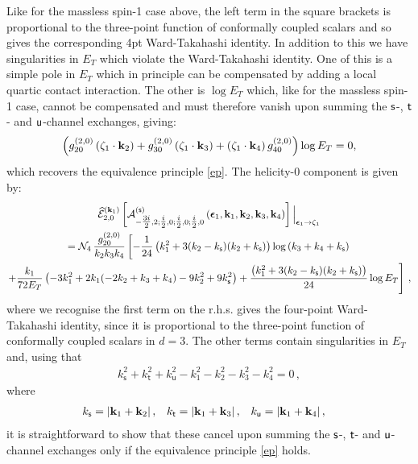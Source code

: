 \documentclass[11pt,a4paper]{article}
\begin{document}
 Like for the massless spin-1 case above, the left term in the square brackets is proportional to the three-point function of conformally coupled scalars and so gives the corresponding 4pt Ward-Takahashi identity. In addition to this we have singularities in $E_T$ which violate the Ward-Takahashi identity. One of this is a simple pole in $E_T$ which in principle can be compensated by adding a local quartic contact interaction. The other is $\log E_T$ which, like for the massless spin-1 case, cannot be compensated and must therefore vanish upon summing the ${\sf s}$-, ${\sf t}$- and ${\sf u}$-channel exchanges, giving:
\begin{equation}
    \left(g^{\left(2,0\right)}_{20}\left(\zeta_1 \cdot {\bf k}_2\right)+g^{\left(2,0\right)}_{30}\left(\zeta_1 \cdot {\bf k}_3\right)+\left(\zeta_1 \cdot {\bf k}_4\right)g^{\left(2,0\right)}_{40}\right)\log E_T=0,
\end{equation}
which recovers the equivalence principle \eqref{ep}. The helicity-0 component is given by:
\begin{multline}
      \widehat{\mathcal{E}}_{2,0}^{(\bold{k}_1)}\left[ {\cal A}^{\left({\sf s}\right)}_{-\tfrac{3i}{2},2;\tfrac{i}{2},0;\tfrac{i}{2},0;\tfrac{i}{2},0}\left(\boldsymbol{\epsilon}_1, {\bf k}_1, {\bf k}_2,{\bf k}_3, {\bf k}_4\right)\right]\Big|_{\boldsymbol{\epsilon}_1 \to \zeta_1}
      \\= {\cal N}_4\,\frac{g_{20}^{(2,0)}}{k_2 k_3 k_4}\left[-\frac{1}{24}\left(k_{1}^2+3 (k_{2}-k_{\mathsf{s}}) (k_{2}+k_{\mathsf{s}})\right)\log \left(k_{3}+k_{4}+k_{\mathsf{s}}\right)\nonumber\right.\\
    \left.+\frac{k_{1}}{72 E_T}\left(-3 k_{1}^2+2 k_{1} (-2 k_{2}+k_{3}+k_{4})-9 k_{2}^2+9 k_{\mathsf{s}}^2\right)+\frac{\left(k_{1}^2+3 (k_{2}-k_{\mathsf{s}}) (k_{2}+k_{\mathsf{s}})\right)}{24}\log E_T \right]\,,
\end{multline}
where we recognise the first term on the r.h.s. gives the four-point Ward-Takahashi identity, since it is proportional to the three-point function of conformally coupled scalars in $d=3$. The other terms contain singularities in $E_T$ and, using that 
\begin{align}
    k_{\mathsf{s}}^2+k_{\mathsf{t}}^2+k_{\mathsf{u}}^2-k_1^2-k_2^2-k_3^2-k_4^2=0\,,
\end{align}
where
\begin{align}
    k_\mathsf{s}&=|{\bf k}_1+{\bf k}_2|\,,& k_\mathsf{t}&=|{\bf k}_1+{\bf k}_3|\,,& k_\mathsf{u}&=|{\bf k}_1+{\bf k}_4|\,,
\end{align}
it is straightforward to show that these cancel upon summing the ${\sf s}$-, ${\sf t}$- and ${\sf u}$-channel exchanges only if the equivalence principle \eqref{ep} holds.\\
\end{document}
